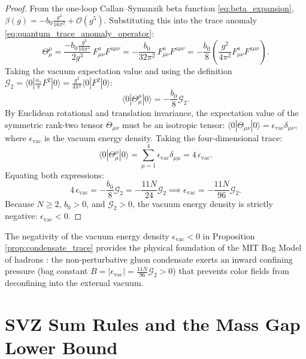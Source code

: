 \begin{proof}
From the one-loop Callan--Symanzik beta function \eqref{eq:beta_expansion}, $\beta(g) = -b_0 \frac{g^3}{16\pi^2} + \mathcal{O}(g^5)$. Substituting this into the trace anomaly \eqref{eq:quantum_trace_anomaly_operator}:
\begin{equation}
\Theta_\mu^\mu = \frac{-b_0 \frac{g^3}{16\pi^2}}{2g^3} \, F_{\mu\nu}^a F^{a\mu\nu} = -\frac{b_0}{32\pi^2} \, F_{\mu\nu}^a F^{a\mu\nu} = -\frac{b_0}{8} \left( \frac{g^2}{4\pi^2} F_{\mu\nu}^a F^{a\mu\nu} \right).
\end{equation}
Taking the vacuum expectation value and using the definition $\mathcal{G}_2 = \langle 0 | \frac{\alpha_s}{\pi} F^2 | 0 \rangle = \frac{g^2}{4\pi^2} \langle 0 | F^2 | 0 \rangle$:
\begin{equation}
\langle 0 | \Theta_\mu^\mu | 0 \rangle = -\frac{b_0}{8} \mathcal{G}_2.
\end{equation}
By Euclidean rotational and translation invariance, the expectation value of the symmetric rank-two tensor $\Theta_{\mu\nu}$ must be an isotropic tensor: $\langle 0 | \Theta_{\mu\nu} | 0 \rangle = \epsilon_{\mathrm{vac}} \delta_{\mu\nu}$, where $\epsilon_{\mathrm{vac}}$ is the vacuum energy density. Taking the four-dimensional trace:
\begin{equation}
\langle 0 | \Theta_\mu^\mu | 0 \rangle = \sum_{\mu=1}^4 \epsilon_{\mathrm{vac}} \delta_{\mu\mu} = 4 \, \epsilon_{\mathrm{vac}}.
\end{equation}
Equating both expressions:
\begin{equation}
4 \, \epsilon_{\mathrm{vac}} = -\frac{b_0}{8} \mathcal{G}_2 = -\frac{11 N}{24} \mathcal{G}_2 \implies \epsilon_{\mathrm{vac}} = -\frac{11 N}{96} \mathcal{G}_2.
\end{equation}
Because $N \ge 2$, $b_0 > 0$, and $\mathcal{G}_2 > 0$, the vacuum energy density is strictly negative: $\epsilon_{\mathrm{vac}} < 0$.
\end{proof}

The negativity of the vacuum energy density $\epsilon_{\mathrm{vac}} < 0$ in Proposition \ref{prop:condensate_trace} provides the physical foundation of the MIT Bag Model of hadrons \cite{Chodos1974}: the non-perturbative gluon condensate exerts an inward confining pressure (bag constant $B = |\epsilon_{\mathrm{vac}}| = \frac{11 N}{96} \mathcal{G}_2 > 0$) that prevents color fields from deconfining into the external vacuum.

\section{SVZ Sum Rules and the Mass Gap Lower Bound}
\label{sec:svz_sum_rules}

